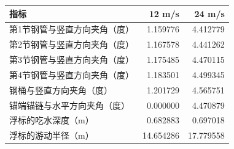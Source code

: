 \begin{tabular}{lrr}
\toprule
指标 & 12 m/s & 24 m/s \\
\midrule
第1节钢管与竖直方向夹角（度） & 1.159776 & 4.412779 \\
第2节钢管与竖直方向夹角（度） & 1.167578 & 4.441262 \\
第3节钢管与竖直方向夹角（度） & 1.175485 & 4.470115 \\
第4节钢管与竖直方向夹角（度） & 1.183501 & 4.499345 \\
钢桶与竖直方向夹角（度） & 1.201729 & 4.565751 \\
锚端锚链与水平方向夹角（度） & 0.000000 & 4.470879 \\
浮标的吃水深度（m） & 0.682883 & 0.697018 \\
浮标的游动半径（m） & 14.654286 & 17.779558 \\
\bottomrule
\end{tabular}

